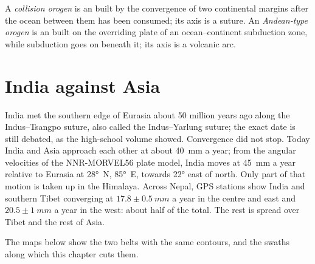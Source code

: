 \begin{definition}\label{def:b2:himalaya-andes:types}
A \emph{collision orogen} is an  built by the convergence of
two continental margins after the ocean between them has been consumed; its axis is a suture.
An \emph{Andean-type orogen} is an  built on the overriding
plate of an ocean--continent subduction zone, while subduction goes on beneath it; its axis
is a volcanic arc.
\end{definition}


\section{India against Asia}\label{sec:b2:himalaya-andes:himalaya}

India met the southern edge of Eurasia about 50 million years ago along the Indus--Tsangpo
suture, also called the Indus--Yarlung suture; the exact date is still debated, as the
high-school volume showed. Convergence did not stop. Today India and Asia approach each other
at about \qty{40}{mm} a year; from the angular velocities of the NNR-MORVEL56 plate model,
India moves at \qty{45}{mm} a year relative to Eurasia at \ang{28}~N, \ang{85}~E, towards
\ang{22} east of north. Only part of that motion is taken up in the Himalaya. Across Nepal,
GPS stations show India and southern Tibet converging at $17.8 \pm \qty{0.5}{mm}$ a year in the
centre and east and $20.5 \pm \qty{1}{mm}$ a year in the west: about half of the total. The rest
is spread over Tibet and the rest of Asia.

The maps below show the two belts with the same contours, and the swaths along which this
chapter cuts them.

